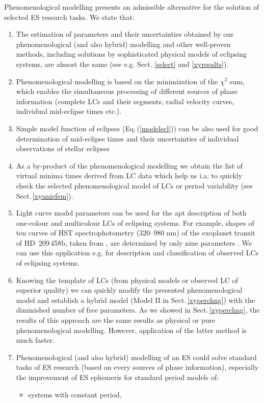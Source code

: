 \documentclass{aa}
\begin{document}
Phenomenological modelling presents an admissible alternative for the solution of selected ES research tasks. We state that:
\begin{enumerate}
\item The estimation of parameters and their uncertainties obtained by our phenomenological (and also hybrid) modelling and other well-proven methods, including solutions by sophisticated physical models of eclipsing systems, are almost the same (see e.g. Sect. \ref{select} and \ref{xyresults}).
\item Phenomenological modelling is based on the minimization of the $\chi^2$ sum, which enables the simultaneous processing of different sources of phase information (complete LCs and their segments, radial velocity curves, individual mid-eclipse times etc.).
\item Simple model function of eclipses (Eq.\,(\ref{modelecl})) can be also used for good determination of mid-eclipse times and their uncertainties of individual observations of stellar eclipses \citep[our model has been standardly used for the determination of time minima of original observations of EBs by Variable star and Exoplanet Section of Czech Astronomical Society since 2011, ][]{brat}
\item As a by-product of the phenomenological modelling we obtain the list of virtual minima times derived from LC data which help us i.a. to quickly check the selected phenomenological model of LCs or period variability (see Sect.\,\ref{xyuniefem}).
\item Light curve model parameters can be used for the apt description of both one-colour and multicolour LCs of eclipsing systems. For example, shapes of ten curves of HST spectrophotometry (320--980 nm) of the exoplanet transit of HD~209\,458b, taken from \citet{knut}, are determined by only nine parameters \citep[see][]{mikcon}. We can use this application e.g. for description and classification of observed LCs of eclipsing systems.
\item Knowing the template of LCs (from physical models or observed LC of superior quality) we can quickly modify the presented phenomenological model and establish a hybrid model (Model II in Sect.\,\ref{xyperchng}) with the diminished number of free parameters. As we showed in Sect.\,\ref{xyperchng}, the results of this approach are the same results as physical or pure phenomenological modelling. However, application of the latter method is much faster.
\item Phenomenological (and also hybrid) modelling of an ES could solve standard tasks of ES research (based on every sources of phase information), especially the improvement of ES ephemeris for standard period models of:
    \begin{itemize}
    \item systems with constant period,


\end{itemize}
\end{enumerate}
\end{document}
